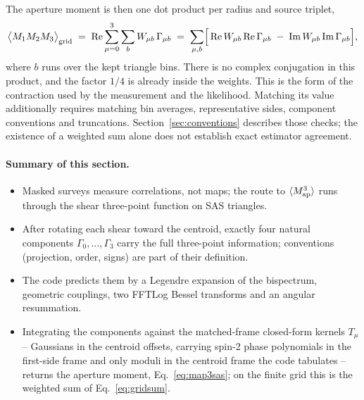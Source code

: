 \documentclass[11pt]{article}
\newcommand{\Map}{M_{\rm ap}}
\numberwithin{equation}{section}
\begin{document}
The aperture moment is then one dot product per radius and source
triplet,
\begin{equation}
  \bigl\langle M_1 M_2 M_3 \bigr\rangle_{\rm grid}
  \;=\;
  {\rm Re} \sum_{\mu=0}^{3} \sum_{b}
  W_{\mu b}\, \Gamma_{\mu b}
  \;=\;
  \sum_{\mu, b}
  \Bigl[\,{\rm Re}\,W_{\mu b}\, {\rm Re}\,\Gamma_{\mu b}
  \;-\; {\rm Im}\,W_{\mu b}\, {\rm Im}\,\Gamma_{\mu b}\Bigr] ,
  \label{eq:gridsum}
\end{equation}
where $b$ runs over the kept triangle bins.  There is no complex
conjugation in this product, and the factor $1/4$ is already inside
the weights.  This is the form of the contraction used by the measurement and the
likelihood. Matching its value additionally requires matching bin
averages, representative sides, component conventions and truncations.
Section~\ref{sec:conventions} describes those checks; the existence of a
weighted sum alone does not establish exact estimator agreement.

\paragraph{Summary of this section.}
\begin{itemize}
  \item Masked surveys measure correlations, not maps; the route to
    $\langle\Map^3\rangle$ runs through the shear three-point
    function on SAS triangles.
  \item After rotating each shear toward the centroid, exactly four
    natural components $\Gamma_0,\ldots,\Gamma_3$ carry the full
    three-point information; conventions (projection, order, signs)
    are part of their definition.
  \item The code predicts them by a Legendre expansion of the
    bispectrum, geometric couplings, two FFTLog Bessel transforms
    and an angular resummation.
  \item Integrating the components against the matched-frame
    closed-form kernels $T_\mu$ -- Gaussians in the centroid
    offsets, carrying spin-2 phase polynomials in the first-side
    frame and only moduli in the centroid frame the code tabulates
    -- returns the aperture moment, Eq.~\eqref{eq:map3sas}; on the
    finite grid this is the weighted sum of
    Eq.~\eqref{eq:gridsum}.
\end{itemize}
\end{document}
